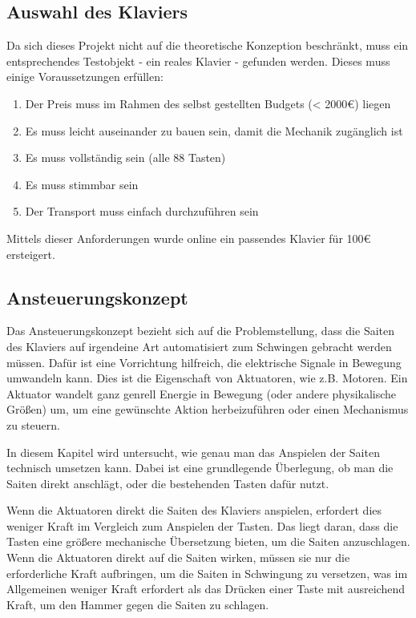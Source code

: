 \subsection{Auswahl des Klaviers}


Da sich dieses Projekt nicht auf die theoretische Konzeption beschränkt, muss ein entsprechendes Testobjekt - ein reales Klavier - gefunden werden.
Dieses muss einige Voraussetzungen erfüllen:
\begin{enumerate}
	\item 	Der Preis muss im Rahmen des selbst gestellten Budgets (< 2000\euro{}) liegen
	\item 	Es muss leicht auseinander zu bauen sein, damit die Mechanik zugänglich ist
	\item 	Es muss vollständig sein (alle 88 Tasten)
	\item 	Es muss stimmbar sein
	\item 	Der Transport muss einfach durchzuführen sein
\end{enumerate}

Mittels dieser Anforderungen wurde online ein passendes Klavier für 100\euro{} ersteigert.

\subsection{Ansteuerungskonzept} \label{subsec:konzeptionhw-ansteuerungskonzept}


Das Ansteuerungskonzept bezieht sich auf die Problemstellung, dass die Saiten des Klaviers auf irgendeine Art automatisiert zum Schwingen gebracht werden müssen.
Dafür ist eine Vorrichtung hilfreich, die elektrische Signale in Bewegung umwandeln kann.
Dies ist die Eigenschaft von Aktuatoren, wie z.B. Motoren.
Ein Aktuator wandelt ganz genrell Energie in Bewegung (oder andere physikalische Größen) um, um eine gewünschte Aktion herbeizuführen oder einen Mechanismus zu steuern. \newline %

In diesem Kapitel wird untersucht, wie genau man das Anspielen der Saiten technisch umsetzen kann.
Dabei ist eine grundlegende Überlegung, ob man die Saiten direkt anschlägt,
oder die bestehenden Tasten dafür nutzt.

Wenn die Aktuatoren direkt die Saiten des Klaviers anspielen, erfordert dies weniger Kraft im Vergleich zum
Anspielen der Tasten. Das liegt daran, dass die Tasten eine größere mechanische Übersetzung bieten, um die Saiten
anzuschlagen. Wenn die Aktuatoren direkt auf die Saiten wirken, müssen sie nur die erforderliche Kraft aufbringen, um
die Saiten in Schwingung zu versetzen, was im Allgemeinen weniger Kraft erfordert als das Drücken einer Taste mit
ausreichend Kraft, um den Hammer gegen die Saiten zu schlagen.


